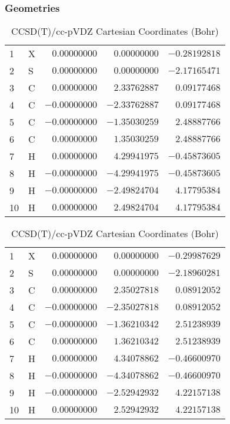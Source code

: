 \documentclass[10pt,oneside]{article}
\begin{document}
\begin{table}[h!]
\subsubsection*{Geometries}
\begin{multicols}{2}
\centering
\caption{CCSD(T)/cc-pVTZ Cartesian Coordinates (Bohr)}
\begin{tabular}{llrrr}
\toprule
1  & X  & $ 0.00000000$ & $ 0.00000000$ & $-0.28192818$ \\
2  & S  & $ 0.00000000$ & $ 0.00000000$ & $-2.17165471$ \\
3  & C  & $ 0.00000000$ & $ 2.33762887$ & $ 0.09177468$ \\
4  & C  & $-0.00000000$ & $-2.33762887$ & $ 0.09177468$ \\
5  & C  & $-0.00000000$ & $-1.35030259$ & $ 2.48887766$ \\
6  & C  & $ 0.00000000$ & $ 1.35030259$ & $ 2.48887766$ \\
7  & H  & $ 0.00000000$ & $ 4.29941975$ & $-0.45873605$ \\
8  & H  & $-0.00000000$ & $-4.29941975$ & $-0.45873605$ \\
9  & H  & $-0.00000000$ & $-2.49824704$ & $ 4.17795384$ \\
10 & H  & $ 0.00000000$ & $ 2.49824704$ & $ 4.17795384$ \\
\bottomrule
\end{tabular}
\caption{CCSD(T)/cc-pVDZ Cartesian Coordinates (Bohr)}
\begin{tabular}{llrrr}
\toprule
1  & X  & $ 0.00000000$ & $ 0.00000000$ & $-0.29987629$ \\
2  & S  & $ 0.00000000$ & $ 0.00000000$ & $-2.18960281$ \\
3  & C  & $ 0.00000000$ & $ 2.35027818$ & $ 0.08912052$ \\
4  & C  & $-0.00000000$ & $-2.35027818$ & $ 0.08912052$ \\
5  & C  & $-0.00000000$ & $-1.36210342$ & $ 2.51238939$ \\
6  & C  & $ 0.00000000$ & $ 1.36210342$ & $ 2.51238939$ \\
7  & H  & $ 0.00000000$ & $ 4.34078862$ & $-0.46600970$ \\
8  & H  & $-0.00000000$ & $-4.34078862$ & $-0.46600970$ \\
9  & H  & $-0.00000000$ & $-2.52942932$ & $ 4.22157138$ \\
10 & H  & $ 0.00000000$ & $ 2.52942932$ & $ 4.22157138$ \\
\bottomrule
\end{tabular}
\end{multicols}
\end{table}
\end{document}
